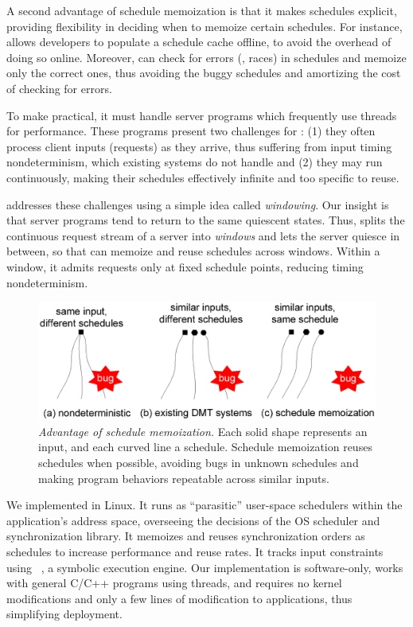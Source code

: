 A second advantage of schedule memoization is that it makes schedules
explicit, providing flexibility in deciding when to memoize certain
schedules.  For instance, \tern allows developers to populate a schedule
cache offline, to avoid the overhead of doing so online.  Moreover,
\tern can check for errors (\eg, races) in schedules and memoize only the
correct ones, thus avoiding the buggy schedules and amortizing the
cost of checking for errors.

To make \tern practical, it must handle server programs which frequently
use threads for performance.  These programs present two challenges for
\tern: (1) they often process client inputs (requests) as they arrive, thus
suffering from input timing nondeterminism, which existing \dmt systems do
not handle and (2) they may run continuously, making their schedules
effectively infinite and too specific to reuse.

\tern addresses these challenges using a simple idea called
\emph{windowing}.  Our insight is that server programs tend to return to the
same quiescent states.
Thus, \tern splits the continuous request stream of a server into
\emph{windows} and lets the server quiesce in between, so that \tern can
memoize and reuse schedules across windows.  Within a window, it admits
requests only at fixed schedule points, reducing timing nondeterminism.

\begin{figure}[t]
\centering
\includegraphics[width=.5\textwidth]{tern/figures/idea.eps}
\caption{\small{\em Advantage of schedule memoization.}  Each solid shape
  represents an input, and each curved line a schedule.  Schedule
  memoization reuses schedules when possible, avoiding bugs in unknown
  schedules and making program behaviors repeatable across similar
  inputs.}
\label{fig:idea}
\end{figure}%


We implemented \tern in Linux.  It runs as ``parasitic''
user-space schedulers within the application's address space, overseeing
the decisions of the OS scheduler and synchronization library.  It
memoizes and reuses synchronization orders as schedules to increase
performance and reuse rates. It tracks input constraints using
\klee~\cite{klee:osdi08}, a symbolic execution engine.  Our implementation
is software-only, works with general C/C++ programs using threads, and
requires no kernel modifications and only a few lines of modification to
applications, thus simplifying deployment.

